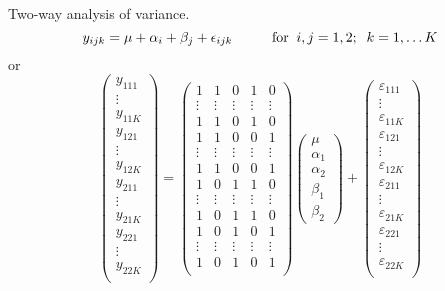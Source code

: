 \newpage
\bexa
Two-way analysis of variance.
$$
y_{ijk} = \mu + \alpha_i + \beta_j +  \epsilon_{ijk}  \hskip1cm {\mbox{for}} \; \;  i,j = 1,2; \;\; k=1,\ldots K
$$
or
$$
\left( \begin{array}{c}
y_{111} \\ \vdots \\ y_{11K} \\ \hline
y_{121} \\ \vdots \\ y_{12K} \\ \hline
y_{211} \\ \vdots \\ y_{21K} \\ \hline
y_{221} \\ \vdots \\ y_{22K} \\
\end{array} \right) =
\left( \begin{array}{ccccc}
1 & 1 & 0 & 1 & 0\\ 
\vdots&\vdots&\vdots&\vdots&\vdots\\
1 & 1 & 0 & 1 & 0\\  \hline
1 & 1 & 0 & 0 & 1\\ 
\vdots&\vdots&\vdots&\vdots&\vdots\\
1 & 1 & 0 & 0 & 1\\  \hline
1 & 0 & 1 & 1 & 0\\ 
\vdots&\vdots&\vdots&\vdots&\vdots\\
1 & 0 & 1 & 1 & 0\\  \hline
1 & 0 & 1 & 0 & 1\\ 
\vdots&\vdots&\vdots&\vdots&\vdots\\
1 & 0 & 1 & 0 & 1\\ 
\end{array} \right)
\left( \begin{array}{c} \mu \\ \alpha_1 \\ \alpha_2 \\ \beta_1 \\ \beta_2
	\end{array} \right) +
\left( \begin{array}{c}
\varepsilon_{111} \\ \vdots \\ \varepsilon_{11K} \\\hline
\varepsilon_{121} \\ \vdots \\ \varepsilon_{12K} \\\hline
\varepsilon_{211} \\ \vdots \\ \varepsilon_{21K} \\\hline
\varepsilon_{221} \\ \vdots \\ \varepsilon_{22K} \\
\end{array} \right) 
$$
\esexa


